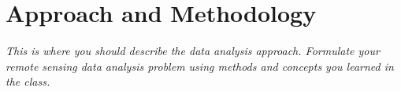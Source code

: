 \section{Approach and Methodology}
\textit{This is where you should describe the data analysis approach. Formulate your remote sensing data analysis problem using methods and concepts you learned in the class. }